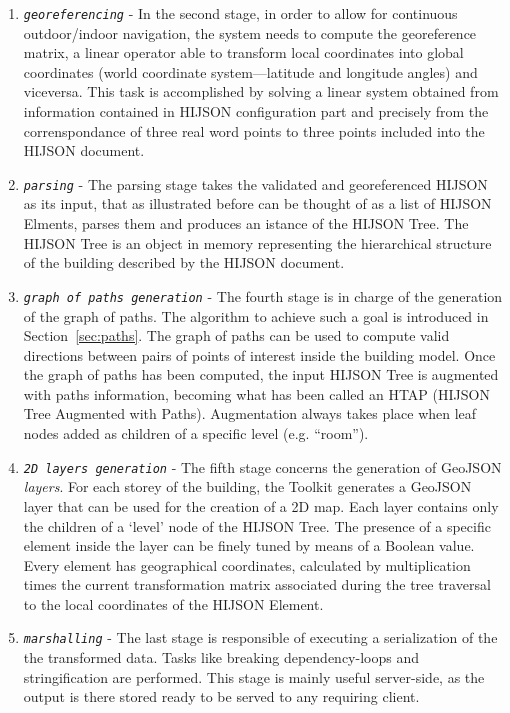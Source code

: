 \begin{enumerate}
\item
 \textit{\texttt{georeferencing}} - In the second stage, in order to allow
 for continuous outdoor/indoor navigation, the system needs to compute
 the georeference matrix, a linear operator able to transform local
 coordinates into global coordinates (world coordinate
 system---latitude and longitude angles) and viceversa. This task is
 accomplished by solving a linear system obtained from information
 contained in HIJSON configuration part and precisely from the
 correnspondance of three real word points to three points included
 into the HIJSON document.
\item
 \textit{\texttt{parsing}} - The parsing stage takes the validated and
 georeferenced HIJSON as its input, that as illustrated before can be
 thought of as a list of HIJSON Elments, parses them and produces an
 istance of the HIJSON Tree. The HIJSON Tree is an object in memory
 representing the hierarchical structure of the building described
 by the HIJSON document.
\item
 \textit{\texttt{graph of paths generation}} - The fourth stage is in char\-ge
 of the generation of the graph of paths. The algorithm to achieve such a 
 goal is introduced in Section~\ref{sec:paths}. The graph of paths can be used to compute valid directions between pairs of points of
 interest inside the building model. Once the graph of paths has been computed, the
 input HIJSON Tree is augmented with paths information, becoming what
 has been called an HTAP (HIJSON Tree Augmented with Paths).
 Augmentation always takes place when leaf nodes added as children of a
 specific level (e.g. ``room'').
\item
 \textit{\texttt{2D layers generation}} - The fifth stage concerns the
 generation of GeoJSON \emph{layers}. For each storey of the building, the Toolkit generates a
 GeoJSON layer that can be used for the creation of a 2D map. Each layer
 contains only the children of a `level' node of the HIJSON Tree. 
 The presence of a specific element inside the layer can be finely tuned 
 by means of a Boolean value. Every element has geographical coordinates, 
 calculated by multiplication times the current transformation matrix associated during the tree traversal to the local
 coordinates of the HIJSON Element.
\item
 \textit{\texttt{marshalling}} - The last stage is responsible of executing
 a serialization of the the transformed data. Tasks like breaking
 dependency-loops and stringification are performed. This stage is
 mainly useful  server-side, as the output is there stored ready to be
 served to any requiring client.
\end{enumerate}

